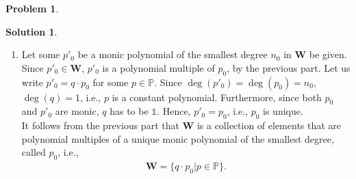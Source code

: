 \documentclass{article}
\theoremstyle{definition}
\newtheorem*{prob*}{Problem}
\newtheorem*{sln*}{Solution}
\newcommand{\W}{\mathbf{W}}
\begin{document}
\begin{prob*}
\begin{sln*}
\begin{enumerate}
		
		\item Let some $p'_0$ be a monic polynomial of the smallest degree $n_0$ in $\W$ be given. Since $p'_0 \in \W$, $p'_0$ is a polynomial multiple of $p_0$, by the previous part. Let us write $p'_0 = q\cdot p_0$ for some $p\in \mathbb{P}$. Since $\deg(p'_0) = \deg(p_0) = n_0$, $\deg(q) = 1$, i.e., $p$ is a constant polynomial. Furthermore, since both $p_0$ and $p'_0$ are monic, $q$ has to be $\mathbb{1}$. Hence, $p'_0 = p_0$, i.e., $p_0$ is unique.\\
		
		It follows from the previous part that $\W$ is a collection of elements that are polynomial multiples of a unique monic polynomial of the smallest degree, called $p_0$, i.e.,
		\begin{align*}
		\W = \{ q\cdot p_0 \big\vert p \in \mathbb{P} \}.
		\end{align*}
	\end{enumerate}
\end{sln*}
\end{prob*}






















\newpage
\end{document}
